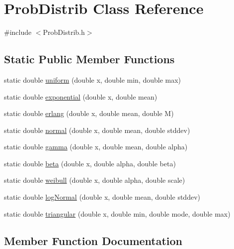 \hypertarget{class_prob_distrib}{}\section{Prob\+Distrib Class Reference}
\label{class_prob_distrib}


{\ttfamily \#include $<$Prob\+Distrib.\+h$>$}

\subsection*{Static Public Member Functions}
\begin{DoxyCompactItemize}
\item 
static double \hyperlink{class_prob_distrib_a4ff9f4d4faa1c29eb970c2629b332032}{uniform} (double x, double min, double max)
\item 
static double \hyperlink{class_prob_distrib_ad638ee57a1ad9ffe4a81e6f7607736a2}{exponential} (double x, double mean)
\item 
static double \hyperlink{class_prob_distrib_abeca85f25317ff97d9ca14d6a4abbb2d}{erlang} (double x, double mean, double M)
\item 
static double \hyperlink{class_prob_distrib_a5ca4ebda2818070339b707a880e3d1a4}{normal} (double x, double mean, double stddev)
\item 
static double \hyperlink{class_prob_distrib_a2a5a2f10a9ba6475591597643b555ab9}{gamma} (double x, double mean, double alpha)
\item 
static double \hyperlink{class_prob_distrib_af74e5c70a59727220d52a7f445992b28}{beta} (double x, double alpha, double beta)
\item 
static double \hyperlink{class_prob_distrib_a74aadd83aaa5459d3a9dd534f6dce82a}{weibull} (double x, double alpha, double scale)
\item 
static double \hyperlink{class_prob_distrib_ad6e3ae223763aae5c2fe7d347523adbb}{log\+Normal} (double x, double mean, double stddev)
\item 
static double \hyperlink{class_prob_distrib_a057f5c5a97ab296f60b1a92ec1886162}{triangular} (double x, double min, double mode, double max)
\end{DoxyCompactItemize}


\subsection{Member Function Documentation}
